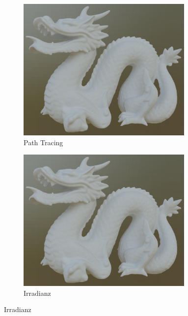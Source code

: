 		\begin{figure}[h]
			\begin{subfigure}[t]{0.33\textwidth}
				\center
				\includegraphics[width=0.95\textwidth]{pic/irr_est-ra-dragon-ref.png}
				\caption{Path Tracing}
				\label{subfig:irr-est-ra-dragon-ref}
			\end{subfigure}
			\begin{subfigure}[t]{0.33\textwidth}
				\center
				\includegraphics[width=0.95\textwidth]{pic/irr_est-ra-dragon-irr.png}
				\caption{Irradianz}
				\label{subfig:irr-est-ra-dragon-irr}
			\end{subfigure}

\end{figure}
